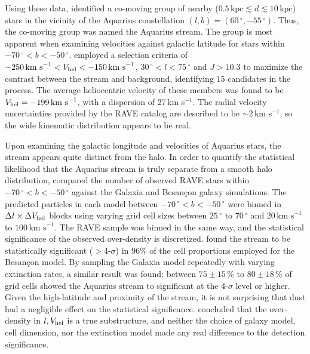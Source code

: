 \documentclass{emulateapj}
\begin{document}
Using these data, \citet{williams;et-al_2011} identified a co-moving group of nearby ($0.5\,\mbox{kpc} \lesssim d \lesssim 10\,\mbox{kpc}$) stars in the vicinity of the Aquarius constellation $(l, b) = (60\,^\circ, -55\,^\circ)$. Thus, the co-moving group was named the Aquarius stream. The group is most apparent when examining velocities against galactic latitude for stars within $-70\,^\circ < b < -50\,^\circ$. \citet{williams;et-al_2011} employed a selection criteria of $-250\,\mbox{km s}^{-1} < V_{\rm hel} < -150\,\mbox{km s}^{-1}$, $30\,^\circ < l < 75\,^\circ$ and $J > 10.3$ to maximize the contrast between the stream and background, identifying 15 candidates in the process. The average heliocentric velocity of these members was found to be $V_{\rm hel} = -199\,\mbox{km s}^{-1}$, with a dispersion of 27\,km s$^{-1}$. The radial velocity uncertainties provided by the RAVE catalog are described to be $\sim$2\,km s$^{-1}$, so the wide kinematic distribution appears to be real.

Upon examining the galactic longitude and velocities of Aquarius stars, the stream appears quite distinct from the halo. In order to quantify the statistical likelihood that the Aquarius stream is truly separate from a smooth halo distribution, \citet{williams;et-al_2011} compared the number of observed RAVE stars within $-70\,^\circ < b < -50\,^\circ$ against the Galaxia \citep{sharma;et-al_2011} and Besan\c{c}on \citep{robin;et-al_2003} galaxy simulations. The predicted particles in each model between $-70\,^\circ < b < -50\,^\circ$ were binned in $\Delta{l} \times \Delta{V_{\rm hel}}$ blocks using varying grid cell sizes between $25\,^\circ$ to $70\,^\circ$ and $20\,\mbox{km s}^{-1}$ to $100\,\mbox{km s}^{-1}$. The RAVE sample was binned in the same way, and the statistical significance of the observed over-density is discretized. \citet{williams;et-al_2011} found the stream to be statistically significant ($>$4-$\sigma$) in 96\% of the cell proportions employed for the Besan\c{c}on model. By sampling the Galaxia model repeatedly with varying extinction rates, a similar result was found: between $75\pm15$\,\% to $80\pm18$\,\% of grid cells showed the Aquarius stream to significant at the 4-$\sigma$ level or higher. Given the high-latitude and proximity of the stream, it is not surprising that dust had a negligible effect on the statistical significance. \citet{williams;et-al_2011} concluded that the over-density in $l, V_{\rm hel}$ is a true substructure, and neither the choice of galaxy model, cell dimension, nor the extinction model made any real difference to the detection significance.
\end{document}
